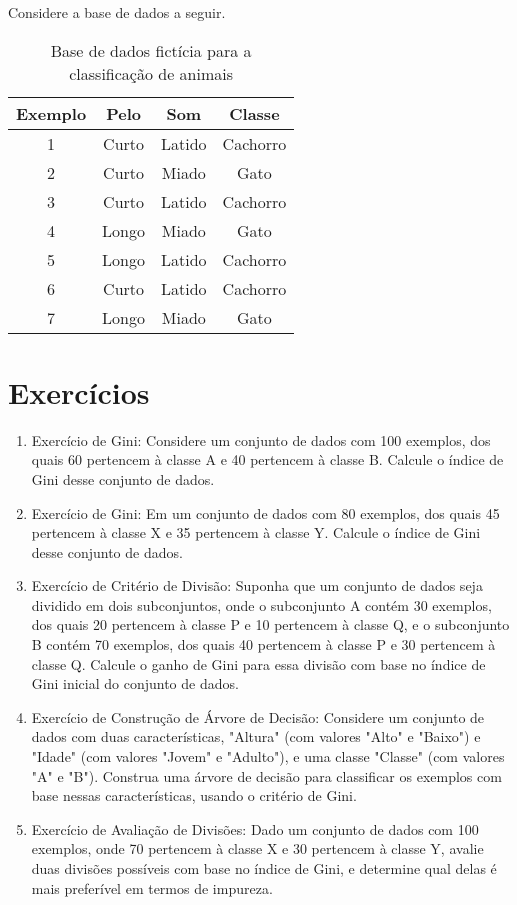 \documentclass[12pt,a4paper, brazil]{article}
\begin{document}
Considere a base de dados a seguir.

\begin{table}[ht]
    \centering
    \begin{tabular}{|c|c|c|c|}
    \hline
    Exemplo & Pelo & Som & Classe \\
    \hline
    1 & Curto & Latido & Cachorro \\
    2 & Curto & Miado & Gato \\
    3 & Curto & Latido & Cachorro \\
    4 & Longo & Miado & Gato \\
    5 & Longo & Latido & Cachorro \\
    6 & Curto & Latido & Cachorro \\
    7 & Longo & Miado & Gato \\
    \hline
    \end{tabular}
    \caption{Base de dados fictícia para a classificação de animais}
    \label{tab:base-de-dados}
\end{table}

\section{Exercícios}

\begin{enumerate}

\item Exercício de Gini:
   Considere um conjunto de dados com 100 exemplos, dos quais 60 pertencem à classe A e 40 pertencem à classe B. Calcule o índice de Gini desse conjunto de dados.

   \item Exercício de Gini:
   Em um conjunto de dados com 80 exemplos, dos quais 45 pertencem à classe X e 35 pertencem à classe Y. Calcule o índice de Gini desse conjunto de dados.

   \item Exercício de Critério de Divisão:
   Suponha que um conjunto de dados seja dividido em dois subconjuntos, onde o subconjunto A contém 30 exemplos, dos quais 20 pertencem à classe P e 10 pertencem à classe Q, e o subconjunto B contém 70 exemplos, dos quais 40 pertencem à classe P e 30 pertencem à classe Q. Calcule o ganho de Gini para essa divisão com base no índice de Gini inicial do conjunto de dados.

   \item Exercício de Construção de Árvore de Decisão:
   Considere um conjunto de dados com duas características, "Altura" (com valores "Alto" e "Baixo") e "Idade" (com valores "Jovem" e "Adulto"), e uma classe "Classe" (com valores "A" e "B"). Construa uma árvore de decisão para classificar os exemplos com base nessas características, usando o critério de Gini.

   \item Exercício de Avaliação de Divisões:
   Dado um conjunto de dados com 100 exemplos, onde 70 pertencem à classe X e 30 pertencem à classe Y, avalie duas divisões possíveis com base no índice de Gini, e determine qual delas é mais preferível em termos de impureza.

\end{enumerate}



\printbibliography
\end{document}
